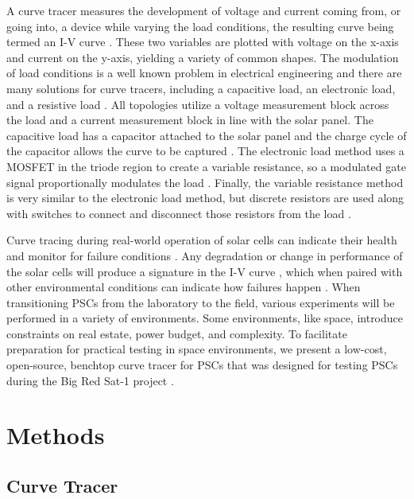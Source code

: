 \documentclass[12pt]{iopart}
\begin{document}
A curve tracer measures the development of voltage and current coming from, or going into, a device while varying the load conditions, the resulting curve being termed an I-V curve \cite{zhu2020comprehensive}.  These two variables are plotted with voltage on the x-axis and current on the y-axis, yielding a variety of common shapes.  The modulation of load conditions is a well known problem in electrical engineering and there are many solutions for curve tracers, including a capacitive load, an electronic load, and a resistive load \cite{zhu2020comprehensive}.  All topologies utilize a voltage measurement block across the load and a current measurement block in line with the solar panel.  The capacitive load has a capacitor attached to the solar panel and the charge cycle of the capacitor allows the curve to be captured \cite{aguilar2017charging}.  The electronic load method uses a MOSFET in the triode region to create a variable resistance, so a modulated gate signal proportionally modulates the load \cite{sahbel2013experimental}.  Finally, the variable resistance method is very similar to the electronic load method, but discrete resistors are used along with switches to connect and disconnect those resistors from the load \cite{rivai2014binary}. 

Curve tracing during real-world operation of solar cells can indicate their health and monitor for failure conditions \cite{zhu2020comprehensive}.  Any degradation or change in performance of the solar cells will produce a signature in the I-V curve \cite{zhu2020comprehensive, arce2024big}, which when paired with other environmental conditions can indicate how failures happen \cite{silverman2025durability, fisher2025measurement}.  When transitioning PSCs from the laboratory to the field, various experiments will be performed in a variety of environments.  Some environments, like space, introduce constraints on real estate, power budget, and complexity.  To facilitate preparation for practical testing in space environments, we present a low-cost, open-source, benchtop curve tracer for PSCs that was designed for testing PSCs during the Big Red Sat-1 project \cite{arce2024big}.

\section*{Methods}

\subsection*{Curve Tracer}
\end{document}
